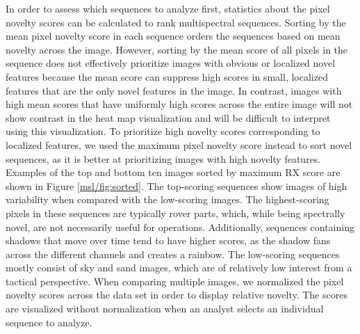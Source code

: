 In order to assess which sequences to analyze first, statistics about the pixel novelty scores can be calculated to rank multispectral sequences. 
Sorting by the mean pixel novelty score in each sequence orders the sequences based on mean novelty across the image.
However, sorting by the mean score of all pixels in the sequence does not effectively prioritize images with obvious or localized novel features because the mean score can suppress high scores in small, localized features that are the only novel features in the image. 
In contrast, images with high mean scores that have uniformly high scores across the entire image will not show contrast in the heat map visualization and will be difficult to interpret using this visualization. 
To prioritize high novelty scores corresponding to localized features, we used the maximum pixel novelty score instead to sort novel sequences, as it is better at prioritizing images with high novelty features. 
Examples of the top and bottom ten images sorted by maximum RX score are shown in Figure \ref{msl/fig:sorted}. 
The top-scoring sequences show images of high variability when compared with the low-scoring images. 
The highest-scoring pixels in these sequences are typically rover parts, which, while being spectrally novel, are not necessarily useful for operations.
Additionally, sequences containing shadows that move over time tend to have higher scores, as the shadow fans across the different channels and creates a rainbow.
The low-scoring sequences mostly consist of sky and sand images, which are of relatively low interest from a tactical perspective. 
When comparing multiple images, we normalized the pixel novelty scores across the data set in order to display relative novelty. 
The scores are visualized without normalization when an analyst selects an individual sequence to analyze. 

